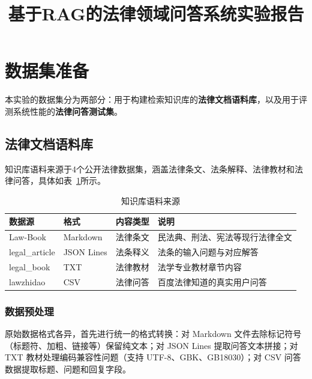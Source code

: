 \documentclass[12pt, a4paper]{article}
\title{\textbf{基于RAG的法律领域问答系统实验报告}}
\author{}
\date{}
\begin{document}
\maketitle

\section{数据集准备}

本实验的数据集分为两部分：用于构建检索知识库的\textbf{法律文档语料库}，以及用于评测系统性能的\textbf{法律问答测试集}。

\subsection{法律文档语料库}

知识库语料来源于4个公开法律数据集，涵盖法律条文、法条解释、法律教材和法律问答，具体如表~\ref{tab:corpus}所示。

\begin{table}[H]
\centering
\caption{知识库语料来源}
\label{tab:corpus}
\begin{tabular}{llll}
\toprule
\textbf{数据源} & \textbf{格式} & \textbf{内容类型} & \textbf{说明} \\
\midrule
Law-Book         & Markdown    & 法律条文   & 民法典、刑法、宪法等现行法律全文 \\
legal\_article   & JSON Lines  & 法条释义   & 法条的输入问题与对应解答 \\
legal\_book      & TXT         & 法律教材   & 法学专业教材章节内容 \\
lawzhidao        & CSV         & 法律问答   & 百度法律知道的真实用户问答 \\
\bottomrule
\end{tabular}
\end{table}

\subsubsection{数据预处理}

原始数据格式各异，首先进行统一的格式转换：对 Markdown 文件去除标记符号（标题符、加粗、链接等）保留纯文本；对 JSON Lines 提取问答文本拼接；对 TXT 教材处理编码兼容性问题（支持 UTF-8、GBK、GB18030）；对 CSV 问答数据提取标题、问题和回复字段。
\end{document}
